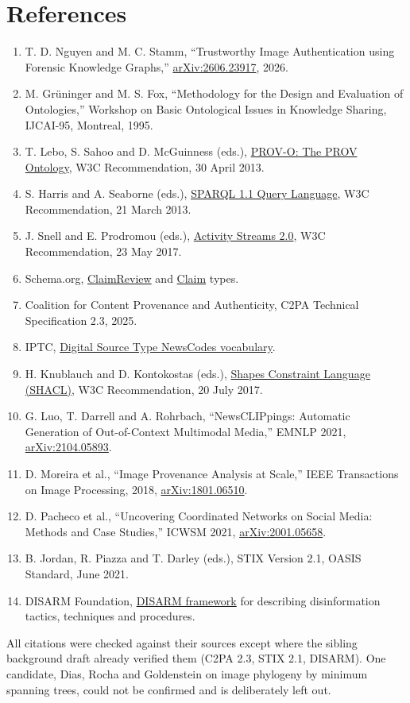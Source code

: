 \documentclass[11pt]{article}
\begin{document}
\section*{References}
\begin{enumerate}
\item T. D. Nguyen and M. C. Stamm, “Trustworthy Image Authentication using Forensic Knowledge Graphs,” \href{https://arxiv.org/abs/2606.23917}{arXiv:2606.23917}, 2026.
\item M. Grüninger and M. S. Fox, “Methodology for the Design and Evaluation of Ontologies,” Workshop on Basic Ontological Issues in Knowledge Sharing, IJCAI-95, Montreal, 1995.
\item T. Lebo, S. Sahoo and D. McGuinness (eds.), \href{https://www.w3.org/TR/prov-o/}{PROV-O: The PROV Ontology}, W3C Recommendation, 30 April 2013.
\item S. Harris and A. Seaborne (eds.), \href{https://www.w3.org/TR/sparql11-query/}{SPARQL 1.1 Query Language}, W3C Recommendation, 21 March 2013.
\item J. Snell and E. Prodromou (eds.), \href{https://www.w3.org/TR/activitystreams-core/}{Activity Streams 2.0}, W3C Recommendation, 23 May 2017.
\item Schema.org, \href{https://schema.org/ClaimReview}{ClaimReview} and \href{https://schema.org/Claim}{Claim} types.
\item Coalition for Content Provenance and Authenticity, C2PA Technical Specification 2.3, 2025.
\item IPTC, \href{http://cv.iptc.org/newscodes/digitalsourcetype/}{Digital Source Type NewsCodes vocabulary}.
\item H. Knublauch and D. Kontokostas (eds.), \href{https://www.w3.org/TR/shacl/}{Shapes Constraint Language (SHACL)}, W3C Recommendation, 20 July 2017.
\item G. Luo, T. Darrell and A. Rohrbach, “NewsCLIPpings: Automatic Generation of Out-of-Context Multimodal Media,” EMNLP 2021, \href{https://arxiv.org/abs/2104.05893}{arXiv:2104.05893}.
\item D. Moreira et al., “Image Provenance Analysis at Scale,” IEEE Transactions on Image Processing, 2018, \href{https://arxiv.org/abs/1801.06510}{arXiv:1801.06510}.
\item D. Pacheco et al., “Uncovering Coordinated Networks on Social Media: Methods and Case Studies,” ICWSM 2021, \href{https://arxiv.org/abs/2001.05658}{arXiv:2001.05658}.
\item B. Jordan, R. Piazza and T. Darley (eds.), STIX Version 2.1, OASIS Standard, June 2021.
\item DISARM Foundation, \href{https://www.disarm.foundation/}{DISARM framework} for describing disinformation tactics, techniques and procedures.
\end{enumerate}
All citations were checked against their sources except where the sibling background draft already verified them (C2PA 2.3, STIX 2.1, DISARM). One candidate, Dias, Rocha and Goldenstein on image phylogeny by minimum spanning trees, could not be confirmed and is deliberately left out.
\end{document}
